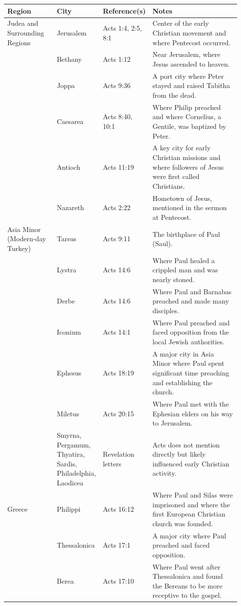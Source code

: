 \begin{longtable}[]{@{}p{0.22\linewidth} p{0.15\linewidth} p{0.15\linewidth} p{0.43\linewidth}@{}}
\toprule
\textbf{Region} & \textbf{City} & \textbf{Reference(s)} & \textbf{Notes} \\
\midrule
\endhead
Judea and Surrounding Regions & Jerusalem & Acts 1:4, 2:5, 8:1 & Center of the early Christian movement and where Pentecost occurred. \\
 & Bethany & Acts 1:12 & Near Jerusalem, where Jesus ascended to heaven. \\
 & Joppa & Acts 9:36 & A port city where Peter stayed and raised Tabitha from the dead. \\
 & Caesarea & Acts 8:40, 10:1 & Where Philip preached and where Cornelius, a Gentile, was baptized by Peter. \\
 & Antioch & Acts 11:19 & A key city for early Christian missions and where followers of Jesus were first called Christians. \\
 & Nazareth & Acts 2:22 & Hometown of Jesus, mentioned in the sermon at Pentecost. \\
\midrule
Asia Minor (Modern-day Turkey) & Tarsus & Acts 9:11 & The birthplace of Paul (Saul). \\
 & Lystra & Acts 14:6 & Where Paul healed a crippled man and was nearly stoned. \\
 & Derbe & Acts 14:6 & Where Paul and Barnabas preached and made many disciples. \\
 & Iconium & Acts 14:1 & Where Paul preached and faced opposition from the local Jewish authorities. \\
 & Ephesus & Acts 18:19 & A major city in Asia Minor where Paul spent significant time preaching and establishing the church. \\
 & Miletus & Acts 20:15 & Where Paul met with the Ephesian elders on his way to Jerusalem. \\
 & Smyrna, Pergamum, Thyatira, Sardis, Philadelphia, Laodicea & Revelation letters & Acts does not mention directly but likely influenced early Christian activity. \\
\midrule
Greece & Philippi & Acts 16:12 & Where Paul and Silas were imprisoned and where the first European Christian church was founded. \\
 & Thessalonica & Acts 17:1 & A major city where Paul preached and faced opposition. \\
 & Berea & Acts 17:10 & Where Paul went after Thessalonica and found the Bereans to be more receptive to the gospel. \\

\end{longtable}
